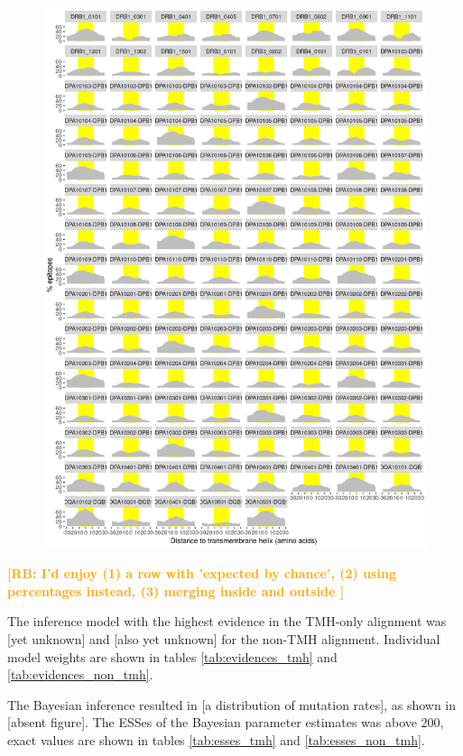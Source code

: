 \documentclass{article}
\newcommand{\richel}[1]{\textcolor{orange}{\textbf{[RB: #1]}}}
\begin{document}
	\begin{figure}[ht]
	  \includegraphics[width=\textwidth]{figure_3.png}
	  \label{fig:3}
	\end{figure}




	
	\richel{
	  I'd enjoy 
	  (1) a row with 'expected by chance', 
	  (2) using percentages instead,
	  (3) merging inside and outside
	}

	The inference model with the highest evidence in the
	TMH-only alignment was [yet unknown] and [also yet unknown]
	for the non-TMH alignment. Individual model weights are shown
	in tables \ref{tab:evidences_tmh} 
	and \ref{tab:evidences_non_tmh}.

	The Bayesian inference resulted in [a distribution of mutation rates],
	as shown in [absent figure].
	The ESSes of the Bayesian parameter estimates was above 200, exact values
	are shown in tables \ref{tab:esses_tmh} and \ref{tab:esses_non_tmh}.
\fi
\end{document}
